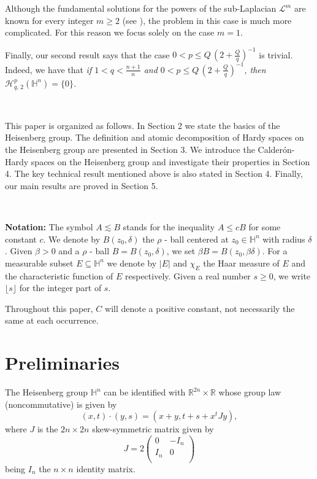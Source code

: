 \documentclass[reqno,10pt]{article}
\theoremstyle{definition}
\numberwithin{equation}{section}
\numberwithin{theorem}{section}
\begin{document}
Although the fundamental solutions for the powers of the sub-Laplacian $\mathcal{L}^m$ are known for every integer $m \geq 2$ 
(see \cite{Benson}), the problem in this case is much more complicated. For this reason we focus solely on the case $m=1$.


Finally, our second result says that the case $0 < p \leq Q \, (2 + \frac{Q}{q})^{-1}$ is trivial. Indeed, we have that \textit{if 
$1 < q < \frac{n+1}{n}$ and $0 < p \leq Q \, (2 + \frac{Q}{q})^{-1}$, then $\mathcal{H}^{p}_{q, \, 2}(\mathbb{H}^{n}) = \{ 0 \}$.}

\

This paper is organized as follows. In Section 2 we state the basics of the Heisenberg group. The definition and atomic decomposition of Hardy spaces on the Heisenberg group are presented in Section 3. We introduce the Calder\'on-Hardy spaces on the Heisenberg group and investigate their properties in Section 4. The key technical result mentioned above is also stated in Section 4. Finally, our main results are proved in Section 5.

\

\textbf{Notation:} The symbol $A \lesssim B$ stands for the inequality $A \leq c B$ for some constant $c$. We denote by 
$B(z_0, \delta)$ the $\rho$ - ball centered at $z_0 \in \mathbb{H}^{n}$ with radius $\delta$. Given $\beta > 0$ and a $\rho$ - ball 
$B= B(z_0, \delta)$, we set $\beta B= B(z_0, \beta \delta)$. For a measurable subset $E\subseteq \mathbb{H}^{n}$ we denote by $\left\vert E\right\vert $ and $\chi_{E}$ the Haar measure of $E$ and the characteristic function of $E$ respectively. Given a real number $s \geq 0$, we write $\lfloor s \rfloor$ for the integer part of $s$.

Throughout this paper, $C$ will denote a positive constant, not necessarily the same at each occurrence.


\section{Preliminaries}

The  Heisenberg group $\mathbb{H}^{n}$ can be identified with $\mathbb{R}^{2n} \times \mathbb{R}$ whose group law 
(noncommutative) is given by
\[
(x,t) \cdot (y,s) = \left( x+y, t+s + x^{t} J y \right),
\]
where $J$ is the $2n \times 2n$ skew-symmetric matrix given by
\[
J= 2 \left( \begin{array}{cc}
                           0 & -I_n \\
                           I_n & 0 \\
                                      \end{array} \right)
\]
being $I_n$ the $n \times n$ identity matrix.
\end{document}
